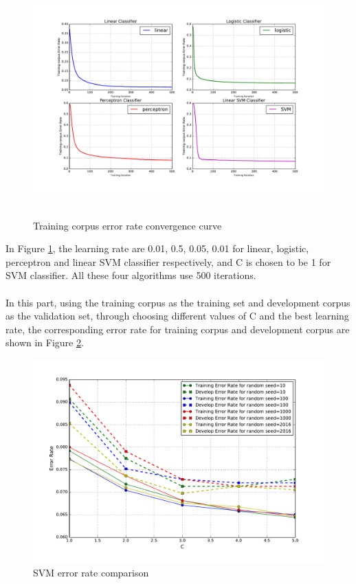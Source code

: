 \begin{figure}[H]
\centering
\includegraphics[width=1.0\textwidth]{./figures/covergence.pdf}\
\caption{\label{fig:convergence} Training corpus error rate convergence curve}
\end{figure}

In Figure \ref{fig:convergence}, the learning rate are 0.01, 0.5, 0.05, 0.01 for linear, logistic, perceptron and linear SVM classifier respectively, and C is chosen to be 1 for SVM classifier. All these four algorithms use 500 iterations.\\

\\

In this part, using the training corpus as the training set and development corpus as the validation set, through choosing different values of C and the best learning rate, the corresponding error rate for training corpus and development corpus are shown in Figure \ref{fig:svm}.

\begin{figure}[H]
\centering
\includegraphics[width=1.0\textwidth]{./figures/svm-comparison.pdf}
\caption{\label{fig:svm} SVM error rate comparison}
\end{figure}

